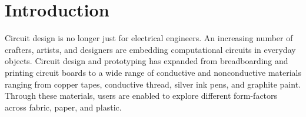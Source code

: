 \documentclass{sigchi}
\begin{document}

\section{Introduction}

Circuit design is no longer just for electrical engineers. An increasing number of crafters, artists, and designers are embedding computational circuits in everyday objects.
Circuit design and prototyping has expanded from breadboarding and printing circuit boards to a wide range of conductive and nonconductive materials ranging from copper tapes, conductive thread, silver ink pens, and graphite paint.
Through these materials, users are enabled to explore different form-factors across fabric, paper, and plastic. 
\end{document}
